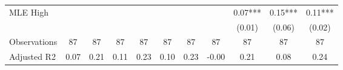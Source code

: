 {\begin{tabular}{l*{10}{c}}
\addlinespace
MLE High    &               &               &               &               &               &               &               &        0.07***&        0.15***&        0.11***\\
            &               &               &               &               &               &               &               &      (0.01)   &      (0.06)   &      (0.02)   \\
\addlinespace\addlinespace
Observations&          87   &          87   &          87   &          87   &          87   &          87   &          87   &          87   &          87   &          87   \\
Adjusted R2 &        0.07   &        0.21   &        0.11   &        0.23   &        0.10   &        0.23   &       -0.00   &        0.21   &        0.08   &        0.24   \\
\bottomrule
\end{tabular}
}
